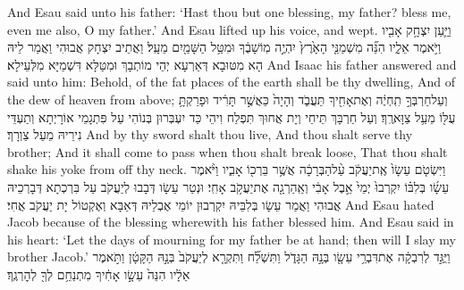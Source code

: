 {And Esau said unto his father: ‘Hast thou but one blessing, my father? bless me, even me also, O my father.’ And Esau lifted up his voice, and wept.}{}
{וַיַּ֛עַן יִצְחָ֥ק אָבִ֖יו וַיֹּ֣אמֶר אֵלָ֑יו הִנֵּ֞ה מִשְׁמַנֵּ֤י הָאָ֙רֶץ֙ יִהְיֶ֣ה מֽוֹשָׁבֶ֔ךָ וּמִטַּ֥ל הַשָּׁמַ֖יִם מֵעָֽל׃}
{וַאֲתֵיב יִצְחָק אֲבוּהִי וַאֲמַר לֵיהּ הָא מִטּוּבָא דְּאַרְעָא יְהֵי מוֹתְבָךְ וּמִטַּלָּא דִּשְׁמַיָּא מִלְּעֵילָא׃}
{And Isaac his father answered and said unto him: Behold, of the fat places of the earth shall be thy dwelling, And of the dew of heaven from above;}{}
{וְעַל\maqqaf חַרְבְּךָ֣ תִֽחְיֶ֔ה וְאֶת\maqqaf אָחִ֖יךָ תַּעֲבֹ֑ד וְהָיָה֙ כַּאֲשֶׁ֣ר תָּרִ֔יד וּפָרַקְתָּ֥ עֻלּ֖וֹ מֵעַ֥ל צַוָּארֶֽךָ׃}
{וְעַל חַרְבָּךְ תֵּיחֵי וְיָת אֲחוּךְ תִּפְלַח וִיהֵי כַּד יִעְבְּרוּן בְּנוֹהִי עַל פִּתְגָמֵי אוֹרָיְתָא וְתַעְדֵּי נִירֵיהּ מֵעַל צַוְרָךְ׃}
{And by thy sword shalt thou live, And thou shalt serve thy brother; And it shall come to pass when thou shalt break loose, That thou shalt shake his yoke from off thy neck.}{}
{וַיִּשְׂטֹ֤ם עֵשָׂו֙ אֶֽת\maqqaf יַעֲקֹ֔ב עַ֨ל\maqqaf הַבְּרָכָ֔ה אֲשֶׁ֥ר בֵּרְכ֖וֹ אָבִ֑יו וַיֹּ֨אמֶר עֵשָׂ֜ו בְּלִבּ֗וֹ יִקְרְבוּ֙ יְמֵי֙ אֵ֣בֶל אָבִ֔י וְאַֽהַרְגָ֖ה אֶת\maqqaf יַעֲקֹ֥ב אָחִֽי׃}
{וּנְטַר עֵשָׂו דְּבָבוּ לְיַעֲקֹב עַל בִּרְכְתָא דְּבָרְכֵיהּ אֲבוּהִי וַאֲמַר עֵשָׂו בְּלִבֵּיהּ יִקְרְבוּן יוֹמֵי אֶבְלֵיהּ דְּאַבָּא וְאֶקְטוֹל יָת יַעֲקֹב אֲחִי׃}
{And Esau hated Jacob because of the blessing wherewith his father blessed him. And Esau said in his heart: ‘Let the days of mourning for my father be at hand; then will I slay my brother Jacob.’}{}
{וַיֻּגַּ֣ד לְרִבְקָ֔ה אֶת\maqqaf דִּבְרֵ֥י עֵשָׂ֖ו בְּנָ֣הּ הַגָּדֹ֑ל וַתִּשְׁלַ֞ח וַתִּקְרָ֤א לְיַעֲקֹב֙ בְּנָ֣הּ הַקָּטָ֔ן וַתֹּ֣אמֶר אֵלָ֔יו הִנֵּה֙ עֵשָׂ֣ו אָחִ֔יךָ מִתְנַחֵ֥ם לְךָ֖ לְהׇרְגֶֽךָ׃}
